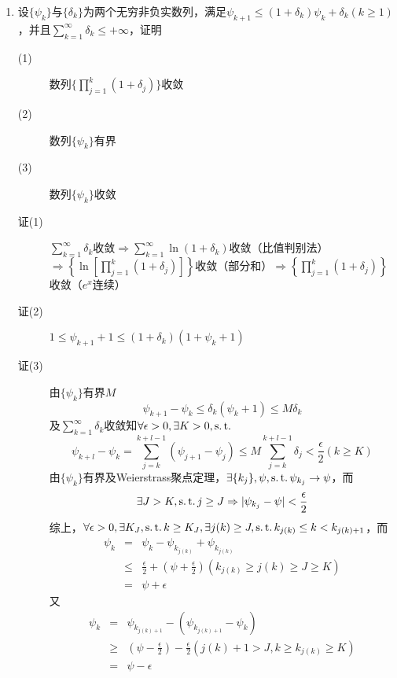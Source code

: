 \begin{enumerate}
\item 设$\{\psi_k\}$与$\{\delta_k\}$为两个无穷非负实数列，满足$\psi_{k+1}\leq(1+\delta_k)\psi_k+\delta_k(k\geq 1)$，并且$\sum_{k=1}^{\infty}\delta_k\leq+\infty$，证明
\begin{description}
\item[(1)] 数列$\{\prod_{j=1}^k(1+\delta_j)\}$收敛
\item[(2)] 数列$\{\psi_k\}$有界
\item[(3)] 数列$\{\psi_k\}$收敛
\item[证(1)] $\sum_{k=1}^{\infty}\delta_k $收敛$\Rightarrow \sum_{k=1}^{\infty}\ln(1+\delta_k)$收敛（比值判别法）$\Rightarrow \left\{ \ln \left[\prod_{j=1}^k(1+\delta_j)\right]\right\}$收敛（部分和）$\Rightarrow \left\{\prod_{j=1}^k(1+\delta_j)\right\}$收敛（$e^x$连续）
\item[证(2)] $1\leq \psi_{k+1}+1\leq (1+\delta_k)(1+\psi_k+1)$
\item[证(3)] 由$\{\psi_k\}$有界$M$
\[
\psi_{k+1}-\psi_k\leq \delta_k(\psi_k+1)\leq M \delta_k
\]
及$\sum_{k=1}^\infty \delta_k$收敛知$\forall \epsilon >0,\exists K>0,\operatorname{s.t.}$
\[
\psi_{k+l}-\psi_{k}=\sum_{j=k}^{k+l-1}(\psi_{j+1}-\psi_j)\leq M\sum_{j=k}^{k+l-1}\delta_j<\frac{\epsilon}{2}(k\geq K)
\]
由$\{\psi_k\}$有界及Weierstrass聚点定理，$\exists \{k_j\},\psi,\operatorname{s.t.} \psi_{k_j}\rightarrow\psi$，而
\[
\exists J>K,\operatorname{s.t.} j\geq J \Rightarrow|\psi_{k_j}-\psi|<\frac{\epsilon}{2}
\]
综上，$\forall \epsilon>0,\exists K_J, \operatorname{s.t.} k\geq K_J,\exists j(k)\geq J,\operatorname{s.t.} k_{j(k)}\leq k<k_{j(k)+1}$，而
\begin{eqnarray*}
\psi_k &= &\psi_k - \psi_{k_{j(k)}}+\psi_{k_{j(k)}}\\
&\leq& \frac{\epsilon}{2}+(\psi+\frac{\epsilon}{2})(k_{j(k)}\geq j(k)\geq J\geq K)\\
&=&\psi+\epsilon
\end{eqnarray*}
又
\begin{eqnarray*}
\psi_k &= &\psi_{k_{j(k)+1}}-(\psi_{k_{j(k)+1}}-\psi_k )\\
&\geq& (\psi-\frac{\epsilon}{2})-\frac{\epsilon}{2} (j(k)+1> J,k\geq k_{j(k)} \geq K)\\
&=&\psi-\epsilon
\end{eqnarray*}
\end{description}


\end{enumerate}
